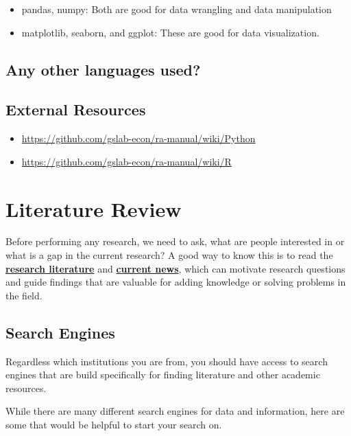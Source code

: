 \documentclass[
]{book}
\providecommand{\tightlist}{%
  \setlength{\itemsep}{0pt}\setlength{\parskip}{0pt}}
\begin{document}
\begin{itemize}
\item
  pandas, numpy: Both are good for data wrangling and data manipulation
\item
  matplotlib, seaborn, and ggplot: These are good for data visualization.
\end{itemize}

\hypertarget{any-other-languages-used}{%
\section{Any other languages used?}\label{any-other-languages-used}}

\hypertarget{external-resources-5}{%
\section{External Resources}\label{external-resources-5}}

\begin{itemize}
\tightlist
\item
  \url{https://github.com/gslab-econ/ra-manual/wiki/Python}
\item
  \url{https://github.com/gslab-econ/ra-manual/wiki/R}
\end{itemize}

\hypertarget{literature-review}{%
\chapter{\texorpdfstring{\textbf{Literature Review}}{Literature Review}}\label{literature-review}}

Before performing any research, we need to ask, what are people interested in or what is a gap in the current research? A good way to know this is to read the \uline{\textbf{research literature}} and \uline{\textbf{current news}}, which can motivate research questions and guide findings that are valuable for adding knowledge or solving problems in the field.

\hypertarget{search-engines}{%
\section{Search Engines}\label{search-engines}}

Regardless which institutions you are from, you should have access to search engines that are build specifically for finding literature and other academic resources.

While there are many different search engines for data and information, here are some that would be helpful to start your search on.
\end{document}
